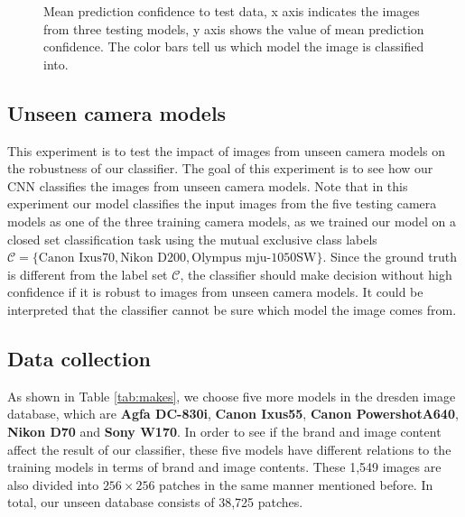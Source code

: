 \documentclass[a4paper, 9pt, twocolumn]{extarticle}
\begin{document}
\begin{figure}
	\centering
	\resizebox{!}{!}{
		{}
	}
	\caption{Mean prediction confidence to test data, x axis indicates the images from three testing models, y axis shows the value of mean prediction confidence. The color bars tell us which model the image is classified into.}
	\label{fig:test confidence}
\end{figure}

\subsection{Unseen camera models}
\label{section:unseen}

This experiment is to test the impact of images from unseen camera models on the robustness of our classifier. The goal of this experiment is to see how our CNN classifies the images from unseen camera models. Note that in this experiment our model classifies the input images from the five testing camera models as one of the three training camera models, as we trained our model on a closed set classification task using the mutual exclusive class labels $\mathcal{C} = \{\text{Canon Ixus70}, \text{Nikon D200}, \text{Olympus mju-1050SW}\}$. Since the ground truth is different from the label set $\mathcal{C}$, the classifier should make decision without high confidence if it is robust to images from unseen camera models. It could be interpreted that the classifier cannot be sure which model the image comes from.

\subsection*{Data collection}
\label{section:unseen data collection & Training}

As shown in Table \ref{tab:makes}, we choose five more models in the dresden image database, which are \textbf{Agfa DC-830i}, \textbf{Canon Ixus55}, \textbf{Canon PowershotA640}, \textbf{Nikon D70} and \textbf{Sony W170}. In order to see if the brand and image content affect the result of our classifier, these five models have different relations to the training models in terms of brand and image contents. These 1,549 images are also divided into $ 256 \times 256 $ patches in the same manner mentioned before. In total, our unseen database consists of 38,725 patches.
\end{document}
